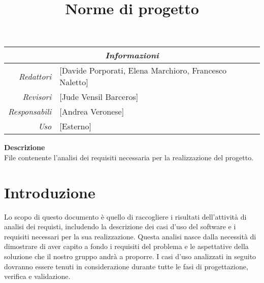 \documentclass[12pt]{article}
\begin{document}
\graphicspath{ {../templates/img/} }
\setcounter{tocdepth}{4}
\setcounter{secnumdepth}{4}
\title{Norme di progetto}

\firstPage

\pagestyle{genericDocstyle}
\maketitle

\begin{center}
    \begin{tabular}{r | l}
		\multicolumn{2}{c}{\textit{Informazioni}}\\
		\hline
		
			\textit{Redattori} &
			[Davide Porporati, Elena Marchioro, Francesco Naletto]\makecell{}\\

			\textit{Revisori} &
			[Jude Vensil Barceros]\makecell{}\\
			\textit{Responsabili} &
			[Andrea Veronese]\makecell{}\\
		      \textit{Uso} & 
                [Esterno]\makecell{}\\
    \end{tabular}
\end{center}

\begin{center}
    \textbf{Descrizione}\\
	File contenente l'analisi dei requisiti necessaria per la realizzazione del progetto. 
\end{center}

\pagebreak

\tableofcontents
\pagebreak

\printindex 

\makeversioni

\section{Introduzione}
Lo scopo di questo documento è quello di raccogliere i risultati dell'attività di analisi dei requisti, includendo la descrizione dei casi d'uso del software e i requisiti necessari per la sua realizzazione.
Questa analisi nasce dalla necessità di dimostrare di aver capito a fondo i requisiti del problema e le aspettative della soluzione che il nostro gruppo andrà a proporre.
I casi d'uso analizzati in seguito dovranno essere tenuti in considerazione durante tutte le fasi di progettazione, verifica e validazione.
\end{document}
